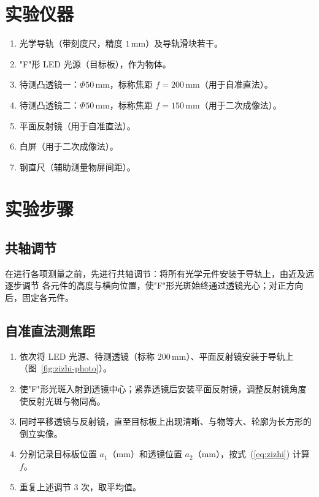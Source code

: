 \documentclass[12pt, a4paper]{article}
\begin{document}
\section{实验仪器}

\begin{enumerate}
  \item 光学导轨（带刻度尺，精度 $1\,\text{mm}$）及导轨滑块若干。
  \item "F"形 LED 光源（目标板），作为物体。
  \item 待测凸透镜一：$\Phi 50\,\text{mm}$，标称焦距 $f = 200\,\text{mm}$（用于自准直法）。
  \item 待测凸透镜二：$\Phi 50\,\text{mm}$，标称焦距 $f = 150\,\text{mm}$（用于二次成像法）。
  \item 平面反射镜（用于自准直法）。
  \item 白屏（用于二次成像法）。
  \item 钢直尺（辅助测量物屏间距）。
\end{enumerate}

\section{实验步骤}

\subsection{共轴调节}

在进行各项测量之前，先进行共轴调节：将所有光学元件安装于导轨上，由近及远逐步调节
各元件的高度与横向位置，使"F"形光斑始终通过透镜光心；对正方向后，固定各元件。

\subsection{自准直法测焦距}

\begin{enumerate}
  \item 依次将 LED 光源、待测透镜（标称 $200\,\text{mm}$）、平面反射镜安装于导轨上（图~\ref{fig:zizhi-photo}）。
  \item 使"F"形光斑入射到透镜中心；紧靠透镜后安装平面反射镜，调整反射镜角度使反射光斑与物同高。
  \item 同时平移透镜与反射镜，直至目标板上出现清晰、与物等大、轮廓为长方形的倒立实像。
  \item 分别记录目标板位置 $a_1$（mm）和透镜位置 $a_2$（mm），按式~(\ref{eq:zizhi}) 计算 $f$。
  \item 重复上述调节 3 次，取平均值。
\end{enumerate}
\end{document}
